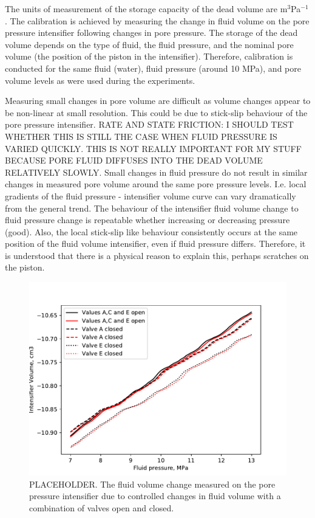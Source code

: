 The units of measurement of the storage capacity of the dead volume are m$^3$Pa$^{-1}$. The calibration is achieved by measuring the change in fluid volume on the pore pressure intensifier following changes in pore pressure. The storage of the dead volume depends on the type of fluid, the fluid pressure, and the nominal pore volume (the position of the piston in the intensifier). Therefore, calibration is conducted for the same fluid (water), fluid pressure (around 10 MPa), and pore volume levels as were used during the experiments.

Measuring small changes in pore volume are difficult as volume changes appear to be non-linear at small resolution. This could be due to stick-slip behaviour of the pore pressure intensifier. RATE AND STATE FRICTION: I SHOULD TEST WHETHER THIS IS STILL THE CASE WHEN FLUID PRESSURE IS VARIED QUICKLY. THIS IS NOT REALLY IMPORTANT FOR MY STUFF BECAUSE PORE FLUID DIFFUSES INTO THE DEAD VOLUME RELATIVELY SLOWLY. Small changes in fluid pressure do not result in similar changes in measured pore volume around the same pore pressure levels. I.e. local gradients of the fluid pressure - intensifier volume curve can vary dramatically from the general trend. The behaviour of the intensifier fluid volume change to fluid pressure change is repeatable whether increasing or decreasing pressure (good). Also, the local stick-slip like behaviour consistently occurs at the same position of the fluid volume intensifier, even if fluid pressure differs. Therefore, it is understood that there is a physical reason to explain this, perhaps scratches on the piston.

\begin{figure}
    \centering
    \includegraphics{figs/pfvol.pdf}
    \caption{PLACEHOLDER. The fluid volume change measured on the pore pressure intensifier due to controlled changes in fluid volume with a combination of valves open and closed.}
    \label{fig:pfcalib}
\end{figure}


